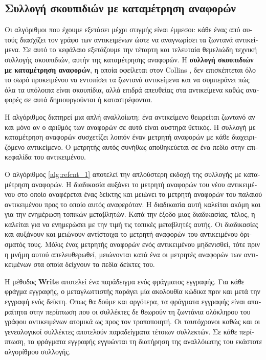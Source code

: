 \begin{greek}
\chapter{Συλλογή σκουπιδιών με καταμέτρηση αναφορών}\label{ch:refcnt}
Οι αλγόριθμοι που έχουμε εξετάσει μέχρι στιγμής είναι έμμεσοι:
κάθε ένας από αυτούς διασχίζει τον γράφο των αντικειμένων
ώστε να αναγνωρίσει τα ζωντανά αντικείμενα. Σε αυτό το κεφάλαιο
εξετάζουμε την τέταρτη και τελευταία θεμελιώδη τεχνική συλλογής
σκουπιδιών, αυτήν της καταμέτρησης αναφορών.  
Η \textbf{συλλογή σκουπιδιών με καταμέτρηση αναφορών}, η
οποία οφείλεται στον Collins \cite{DBLP:journals/cacm/Collins60},
δεν επισκέπτεται όλο το σωρό προκειμένου να εντοπίσει τα
ζωντανά αντικείμενα και να συμπεράνει πώς όλα τα υπόλοιπα
είναι σκουπίδια, αλλά επιδρά απευθείας στα αντικείμενα
καθώς αναφορές σε αυτά δημιουργούνται ή καταστρέφονται.

Η αλγόριθμος διατηρεί μια απλή αναλλοίωτη: ένα αντικείμενο
θεωρείται ζωντανό αν και μόνο αν ο αριθμός των αναφορών σε
αυτό είναι αυστηρά θετικός. Η συλλογή με καταμέτρηση αναφορών
συσχετίζει λοιπόν έναν μετρητή αναφορών με κάθε διαχειριζόμενο
αντικείμενο. Ο μετρητής αυτός συνήθως αποθηκεύεται σε ένα
πεδίο στην  επικεφαλίδα του αντικειμένου.

Ο αλγόριθμος \ref{alg:refcnt_1} αποτελεί την απλούστερη
εκδοχή της συλλογής με καταμέτρηση αναφορών. Η διαδικασία
 αυξάνει το μετρητή αναφορών του νέου
αντικειμένου στο οποίο αναφέρεται ένας δείκτης και μειώνει
το μετρητή αναφορών του παλαιού αντικειμένου προς το οποίο
αυτός αναφερόταν. Η διαδικασία αυτή καλείται ακόμη και για
την ενημέρωση τοπικών μεταβλητών. Κατά την έξοδο μιας
διαδικασίας, τέλος, η  καλείται για να
ενημερώσει με την τιμή \null τις τοπικές μεταβλητές αυτής.
Οι διαδικασίες  και 
αυξάνουν και μειώνουν αντίστοιχα το μετρητή αναφορών του
αντικειμένου όρισματός τους. Μόλις ένας μετρητής αναφορών
ενός αντικειμένου μηδενισθεί, τότε πριν η μνήμη αυτού
απελευθερωθεί, μειώνονται κατά ένα οι μετρητές αναφορών
των αντικειμένων στα οποία δείχνουν τα πεδία δείκτες
του.

Η μέθοδος \textbf{Write} αποτελεί ένα παράδειγμα ενός φράγματος
εγγραφής. Για κάθε φράγμα εγγραφής, ο μεταγλωττιστής παράγει
μία ακολουθία κώδικα πριν και μετά την εγγραφή ενός δείκτη.
Όπως θα δούμε και αργότερα, τα φράγματα εγγραφής είναι
απαραίτητα στην περίπτωση που οι συλλέκτες δε θεωρούν τη
ζωντάνια ολόκληρου του γράφου αντικειμένων ατομικά ως προς
τον τροποποιητή. Οι ταυτόχρονοι καθώς και οι γενεαλογικοί
συλλέκτες αποτελούν παραδείγματα τέτοιων συλλεκτών. Σε κάθε
περίπτωση, τα φράγματα εγγραφής εγγυώνται τη διατήρηση της
αναλλόιωτης του εκάστοτε αλγορίθμου συλλογής.


\end{greek}
